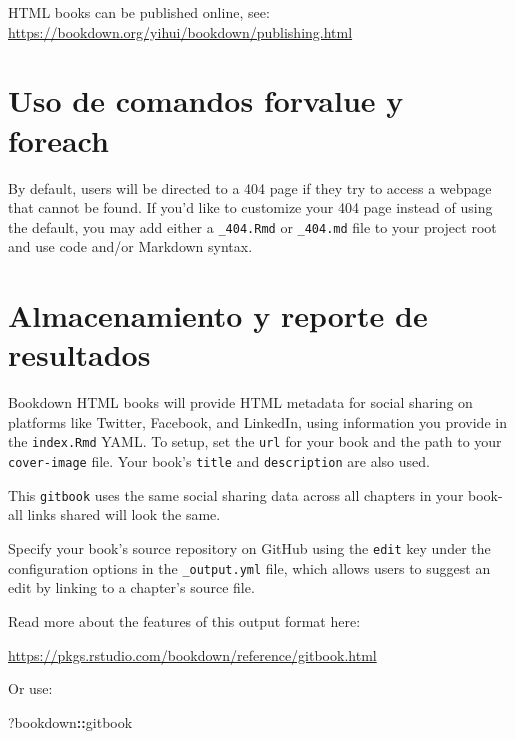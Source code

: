 \documentclass[
]{book}
\newenvironment{Shaded}{\begin{snugshade}}{\end{snugshade}}
\newcommand{\NormalTok}[1]{#1}
\newcommand{\SpecialCharTok}[1]{\textcolor[rgb]{0.81,0.36,0.00}{\textbf{#1}}}
\theoremstyle{definition}
\theoremstyle{definition}
\theoremstyle{definition}
\theoremstyle{definition}
\theoremstyle{remark}
\begin{document}
HTML books can be published online, see: \url{https://bookdown.org/yihui/bookdown/publishing.html}

\hypertarget{uso-de-comandos-forvalue-y-foreach}{%
\section{Uso de comandos forvalue y foreach}\label{uso-de-comandos-forvalue-y-foreach}}

By default, users will be directed to a 404 page if they try to access a webpage that cannot be found. If you'd like to customize your 404 page instead of using the default, you may add either a \texttt{\_404.Rmd} or \texttt{\_404.md} file to your project root and use code and/or Markdown syntax.

\hypertarget{almacenamiento-y-reporte-de-resultados}{%
\section{Almacenamiento y reporte de resultados}\label{almacenamiento-y-reporte-de-resultados}}

Bookdown HTML books will provide HTML metadata for social sharing on platforms like Twitter, Facebook, and LinkedIn, using information you provide in the \texttt{index.Rmd} YAML. To setup, set the \texttt{url} for your book and the path to your \texttt{cover-image} file. Your book's \texttt{title} and \texttt{description} are also used.

This \texttt{gitbook} uses the same social sharing data across all chapters in your book- all links shared will look the same.

Specify your book's source repository on GitHub using the \texttt{edit} key under the configuration options in the \texttt{\_output.yml} file, which allows users to suggest an edit by linking to a chapter's source file.

Read more about the features of this output format here:

\url{https://pkgs.rstudio.com/bookdown/reference/gitbook.html}

Or use:

\begin{Shaded}
\begin{Highlighting}[]
\NormalTok{?bookdown}\SpecialCharTok{::}\NormalTok{gitbook}
\end{Highlighting}
\end{Shaded}


  
\end{document}
